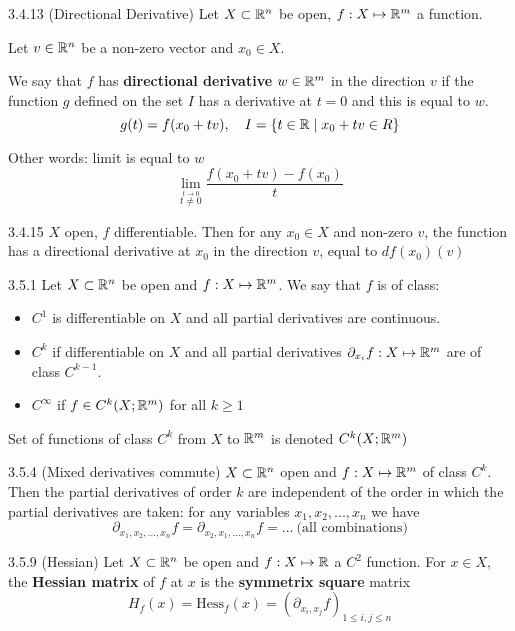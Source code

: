 \begin{definition}{3.4.13 (Directional Derivative)}
    Let $X \subset \mathbb{R}^n$ be open, $f: X \mapsto \mathbb{R}^m$ a function.

    Let $v \in \mathbb{R}^n$ be a non-zero vector and $x_0 \in X$.

    We say that $f$ has \textbf{directional derivative} $w \in \mathbb{R}^m$ in the direction $v$
    if the function $g$ defined on the set $I$ has a derivative at $t = 0$ and this is equal to $w$.
    \[ g(t) = f(x_0 + tv), \quad I = \left\{ t \in \mathbb{R} \mid x_0 + tv \in R \right\} \]

    Other words: limit is equal to $w$
    \[ \lim_{\stackrel{t \to 0}{t \ne 0}} \frac{f(x_0 + tv) - f(x_0)}{t} \]
\end{definition}

\begin{proposition}{3.4.15}
    $X$ open, $f$ differentiable. Then for any $x_0 \in X$ and non-zero $v$, the function has
    a directional derivative at $x_0$ in the direction $v$, equal to $df(x_0)(v)$
\end{proposition}

\begin{definition}{3.5.1}
    Let $X \subset \mathbb{R}^n$ be open and $f: X \mapsto \mathbb{R}^m$.
    We say that $f$ is of class:
    \begin{itemize}
        \item $C^1$ is differentiable on $X$ and all partial derivatives are continuous.
        \item $C^k$ if differentiable on $X$ and all partial derivatives $\partial_{x_i}f: X \mapsto \mathbb{R}^m$ are of class $C^{k-1}$.
        \item $C^\infty$ if $f \in C^k(X;\mathbb{R}^m)$ for all $k \ge 1$
    \end{itemize}
    Set of functions of class $C^k$ from $X$ to $\mathbb{R}^m$ is denoted $C^k(X; \mathbb{R}^m)$
\end{definition}

\begin{proposition}{3.5.4 (Mixed derivatives commute)}
    $X \subset \mathbb{R}^n$ open and $f: X \mapsto \mathbb{R}^m$ of class $C^k$. Then the partial derivatives
    of order $k$ are independent of the order in which the partial derivatives are taken: for any variables
    $x_1, x_2, ..., x_n$ we have
    \[ \partial_{x_1, x_2, ..., x_n}f = \partial_{x_2, x_1, ..., x_n}f = ...   \ \mbox{(all combinations)}\]
\end{proposition}

\begin{definition}{3.5.9 (Hessian)}
    Let $X \subset \mathbb{R}^n$ be open and $f: X \mapsto \mathbb{R}$ a $C^2$ function.
    For $x \in X$, the \textbf{Hessian matrix} of $f$ at $x$ is the \textbf{symmetrix square} matrix
    \[ \mathit{H}_f(x) = \mathrm{Hess}_f(x) = (\partial_{x_i, x_j}f)_{1 \le i, j \le n} \]
\end{definition}

